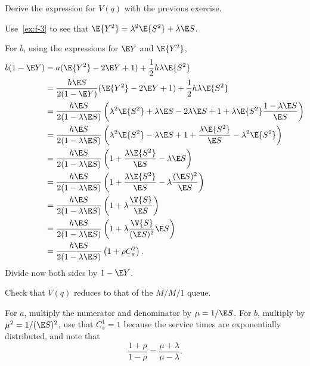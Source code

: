 \begin{exercise}\label{ex:nm-2}
Derive
 the expression for $V(q)$ with the previous exercise.
\begin{hint}
Use~\cref{ex:f-3} to see that $\E{Y^2} = \lambda^2 \E{S^2} + \lambda \E S$.
\end{hint}
\begin{solution}
  For $b$, using the expressions for $\E Y$ and $\E{Y^2}$,
\begin{align*}
b(1-\E Y) &= a(\E{Y^2} - 2 \E Y + 1) + \frac 12 h \lambda \E{S^2} \\
&= \frac{h \E S}{2(1-\E Y)} (\E{Y^2} - 2 \E Y + 1) + \frac 12 h \lambda \E{S^2} \\
&= \frac{h \E S}{2(1-\lambda \E S)} \left(\lambda^2 \E{S^2} + \lambda \E S - 2 \lambda \E S + 1 +  \lambda \E{S^2}\frac{1-\lambda \E S}{\E S}\right) \\
&= \frac{h \E S}{2(1-\lambda \E S)} \left(\lambda^2 \E{S^2} - \lambda \E S + 1 +  \frac{\lambda \E{S^2}}{\E S} - \lambda^2 \E{S^2}\right) \\
&= \frac{h \E S}{2(1-\lambda \E S)} \left(1+ \frac{\lambda \E{S^2}}{\E S }  - \lambda \E S \right) \\
&= \frac{h \E S}{2(1-\lambda \E S)} \left( 1+ \frac{\lambda \E{S^2}}{\E S }  - \lambda \frac{(\E S)^2}{\E S}\right) \\
&= \frac{h \E S}{2(1-\lambda \E S)} \left( 1+ \lambda \frac{\V{S}}{\E S }\right)\\
&= \frac{h \E S}{2(1-\lambda \E S)} \left( 1+ \lambda \frac{\V{S}}{(\E S)^2 } \E S\right)\\
&= \frac{h \E S}{2(1-\lambda \E S)} \left( 1+ \rho C_s^2\right).
\end{align*}
Divide now both sides by $1-\E Y$.
\end{solution}
\end{exercise}

\begin{exercise}
 Check  that $V(q)$ reduces to that of the $M/M/1$ queue.
\begin{solution}
  For $a$, multiply the numerator and denominator by $\mu=1/ \E S$.
  For $b$, multiply by $\mu^2 = 1/(\E S)^2$, use that $C_s^1=1$ because the service times are exponentially distributed, and note that
  \begin{equation*}
    \frac{1+\rho}{1-\rho} = \frac{\mu + \lambda}{\mu-\lambda}.
  \end{equation*}
\end{solution}
\end{exercise}


